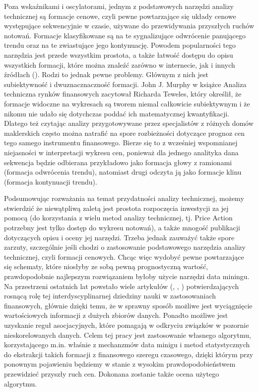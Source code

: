 \documentclass[polish, twoside, 12pt, a4paper]{article}
\theoremstyle{definition}
\theoremstyle{plain}
\theoremstyle{remark}
\begin{document}
Poza wskaźnikami i oscylatorami, jednym z podstawowych narzędzi analizy technicznej są formacje cenowe, czyli pewne powtarzające się układy cenowe występujące sekwencyjnie w czasie, używane 
do przewidywania przyszłych ruchów notowań. Formacje klasyfikowane są na te sygnalizujące odwrócenie panującego trendu oraz na te zwiastujące jego kontynuację. Powodem popularności tego narzędzia 
jest przede wszystkim prostota, a także łatwość dostępu do opisu wszystkich formacji, które można znaleźć zarówno w internecie, jak i innych źródłach (\cite{Bulkowski2005}). Rodzi to jednak pewne problemy. Głównym
z nich jest subiektywność i dwuznacznaczność formacji. John J. Murphy w książce Analiza techniczna rynków finansowych zacytował Richarda Teweles, który określił, że formacje widoczne na wykresach są tworem niemal 
całkowicie subiektywnym i że nikomu nie udało się dotychczas poddać ich matematycznej kwantyfikacji. Dlatego też czytając analizy przygotowywane przez specjalistów z różnych domów maklerskich często można natrafić 
na spore rozbieżności dotyczące prognoz cen tego samego instrumentu finansowego. Bierze się to z wcześniej wspomnianej niejasności w interpretacji wykresu cen, ponieważ dla jednego analityka dana sekwencja będzie 
odbierana przykładowo jako formacja głowy z ramionami (formacja odwrócenia trendu), natomiast drugi odczyta ją jako formacje klinu (formacja kontynuacji trendu).

Podsumowując rozważania na temat przydatności analizy technicznej, możemy stwierdzić że niewątpliwą zaletą jest prostota rozpoczęcia inwestycji za jej pomocą (do korzystania z wielu metod analizy technicznej, 
tj. Price Action potrzebny jest tylko dostęp do wykresu notowań), a także mnogość publikacji dotyczących opisu i oceny jej narzędzi. Trzeba jednak zauważyć także spore zarzuty, szczególnie jeśli chodzi o zastosowanie
podstawowego narzędzia analizy technicznej, czyli formacji cenowych. Chcąc więc wydobyć pewne powtarzające się schematy, które niosłyby ze sobą pewną prognostyczną wartość, prawdopodobnie najlepszym rozwiązaniem 
byłoby użycie narzędzi data miningu. Na przestrzeni ostatnich lat powstało wiele artykułów (\cite{Akkaya2011},  \cite{Zhang2004}, \cite{Weigend1996}) potwierdzających rosnącą rolę tej interdyscyplinarnej dziedziny nauki w zastosowaniach finansowych, głównie 
dzięki temu, że w sprawny sposób możliwe jest wyciągnięcie wartościowych informacji z dużych zbiorów danych. Ponadto możliwe jest uzyskanie reguł asocjacyjnych, które pomagają w odkryciu związków w pozornie 
nieskorelowanych danych.  Celem tej pracy jest zastosowanie własnego algorytmu, korzystającego m.in. właśnie z mechanzmów data minigu i metod statystycznych do ekstrakcji takich formacji  z finansowego szeregu czasowego, 
dzięki którym przy ponownym pojawieniu będziemy w stanie z wysokim prawdopodobieństwem przewidzieć przyszły ruch cen. Dokonana zostanie także ocena użytego algorytmu. 
\end{document}
